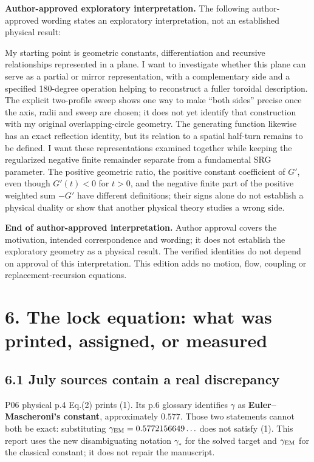 \documentclass[11pt,a4paper]{article}
\begin{document}
\clearpage
\textbf{Author-approved exploratory interpretation.} The following author-approved wording states an exploratory interpretation, not an established physical result:

My starting point is geometric constants, differentiation and recursive relationships represented in a plane. I want to investigate whether this plane can serve as a partial or mirror representation, with a complementary side and a specified 180-degree operation helping to reconstruct a fuller toroidal description. The explicit two-profile sweep shows one way to make ``both sides'' precise once the axis, radii and sweep are chosen; it does not yet identify that construction with my original overlapping-circle geometry. The generating function likewise has an exact reflection identity, but its relation to a spatial half-turn remains to be defined. I want these representations examined together while keeping the regularized negative finite remainder separate from a fundamental SRG parameter. The positive geometric ratio, the positive constant coefficient of $G'$, even though $G'(t) < 0$ for $t > 0$, and the negative finite part of the positive weighted sum $-G'$ have different definitions; their signs alone do not establish a physical duality or show that another physical theory studies a wrong side.

\textbf{End of author-approved interpretation.} Author approval covers the motivation, intended correspondence and wording; it does not establish the exploratory geometry as a physical result. The verified identities do not depend on approval of this interpretation. This edition adds no motion, flow, coupling or replacement-recursion equations.

\clearpage
\section*{6. The lock equation: what was printed, assigned, or measured}

\subsection*{6.1 July sources contain a real discrepancy}

P06 physical p.4 Eq.(2) prints (1). Its p.6 glossary identifies $\gamma$ as \textbf{Euler--Mascheroni's constant}, approximately $0.577$. Those two statements cannot both be exact: substituting $\gamma_{\rm EM}=0.5772156649\ldots$ does not satisfy (1). This report uses the new disambiguating notation $\gamma_*$ for the solved target and $\gamma_{\rm EM}$ for the classical constant; it does not repair the manuscript.
\end{document}
